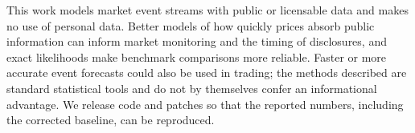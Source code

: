 This work models market event streams with public or licensable data and makes no use of
personal data. Better models of how quickly prices absorb public information can inform market
monitoring and the timing of disclosures, and exact likelihoods make benchmark comparisons more
reliable. Faster or more accurate event forecasts could also be used in trading; the methods
described are standard statistical tools and do not by themselves confer an informational
advantage. We release code and patches so that the reported numbers, including the corrected
baseline, can be reproduced.
